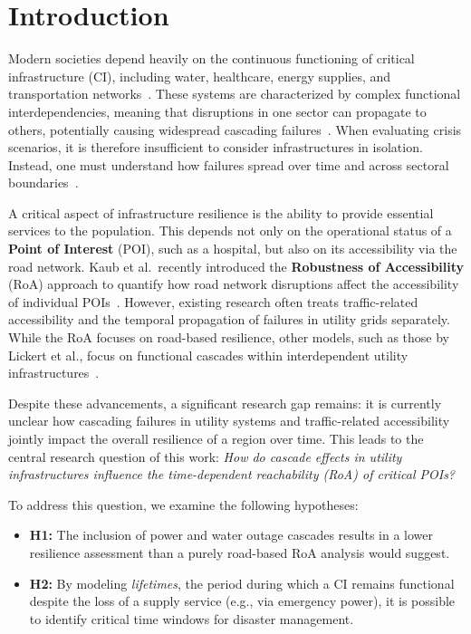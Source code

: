
\section{Introduction}
\label{sec:introduction}

Modern societies depend heavily on the continuous functioning of critical infrastructure (CI), including water, healthcare, energy supplies, and transportation networks~\cite{lickert2024,chiaradonna2007}.
These systems are characterized by complex functional interdependencies, meaning that disruptions in one sector can propagate to others, potentially causing widespread cascading failures~\cite{laprie2007,buldyrev2010}.
When evaluating crisis scenarios, it is therefore insufficient to consider infrastructures in isolation.
Instead, one must understand how failures spread over time and across sectoral boundaries~\cite{lickert2024}.

A critical aspect of infrastructure resilience is the ability to provide essential services to the population.
This depends not only on the operational status of a \textbf{Point of Interest} (POI), such as a hospital, but also on its accessibility via the road network.
Kaub et al.\ recently introduced the \textbf{Robustness of Accessibility} (RoA) approach to quantify how road network disruptions affect the accessibility of individual POIs~\cite{kaub2024}.
However, existing research often treats traffic-related accessibility and the temporal propagation of failures in utility grids separately.
While the RoA focuses on road-based resilience, other models, such as those by Lickert et al., focus on functional cascades within interdependent utility infrastructures~\cite{lickert2024}.

Despite these advancements, a significant research gap remains: it is currently unclear how cascading failures in utility systems and traffic-related accessibility jointly impact the overall resilience of a region over time.
This leads to the central research question of this work: \textit{How do cascade effects in utility infrastructures influence the time-dependent reachability (RoA) of critical POIs?}

\noindent \newline
To address this question, we examine the following hypotheses:
\begin{itemize}
    \item \textbf{H1:} The inclusion of power and water outage cascades results in a lower resilience assessment than a purely road-based RoA analysis would suggest.
    \item \textbf{H2:} By modeling \textit{lifetimes}, the period during which a CI remains functional despite the loss of a supply service (e.g., via emergency power), it is possible to identify critical time windows for disaster management.
\end{itemize}

